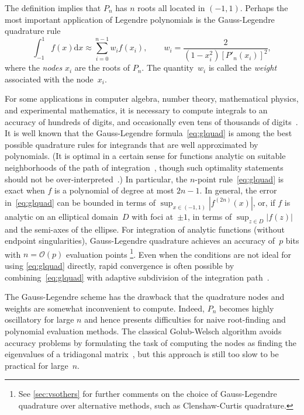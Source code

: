 \documentclass[nohypdvips,review]{siamart0216}
\newcommand{\dx}{\mathrm d x}
\newcommand{\OO}{\mathcal{O}}
\begin{document}
The definition implies that $P_n$ has $n$ roots all located in $(-1,1)$.
Perhaps the most important application of Legendre polynomials
is the Gauss-Legendre quadrature rule
\begin{equation}
\label{eq:glquad}
\int_{-1}^{1} f(x) \dx \approx \sum_{i=0}^{n-1} w_i f(x_i), \qquad
w_i = \frac{2}{(1-x_i^2) [P'_n(x_i)]^2},
\end{equation}
where the \emph{nodes} $x_i$ are the roots of $P_n$.
The quantity~$w_i$ is called the \emph{weight} associated
with the node~$x_i$.

For some applications in computer algebra, number theory,
mathematical physics, and experimental mathematics,
it is necessary to compute integrals to an accuracy of
hundreds of digits, and occasionally even tens of
thousands of
digits~\cite{bailey2011high,BaileyBorweinCrandall2006,Broadhurst2016,Molin2010a}.
It is well known that the Gauss-Legendre formula~\cref{eq:glquad} is
among the best possible quadrature rules for integrands that are
well approximated by polynomials.
(It is optimal in a certain sense for functions analytic on
suitable neighborhoods of the path of integration~\cite{kowalski1985gauss},
though such optimality statements should not be
over-interpreted~\cite{Trefethen2011}.)
In particular, the $n$-point rule~\cref{eq:glquad} is exact
when $f$ is a polynomial of degree at most $2n-1$.
In general, the error in~\cref{eq:glquad} can be bounded in terms of
$\sup_{x \in (-1,1)} |f^{(2n)}(x)|$, or, if $f$ is analytic on an
elliptical domain~$D$ with foci at~$\pm 1$, in terms of
$\sup_{z \in D} |f(z)|$ and the semi-axes of the ellipse.
For integration of analytic functions (without endpoint singularities),
Gauss-Legendre quadrature achieves an accuracy of~$p$ bits with $n = \OO(p)$
evaluation points%
\footnote{See \cref{sec:vsothers} for further comments on the choice of
Gauss-Legendre quadrature over alternative methods, such as
Clenshaw-Curtis quadrature.}.
Even when the conditions are not ideal for using \cref{eq:glquad} directly,
rapid convergence is often possible
by combining~\cref{eq:glquad}
with adaptive subdivision of the integration path~\cite{petras2002self}.

The Gauss-Legendre scheme has the drawback
that the quadrature nodes and weights are
somewhat inconvenient to compute.
Indeed, $P_n$ becomes highly oscillatory for
large $n$ and hence presents difficulties
for naive root-finding and polynomial evaluation methods.
The classical Golub-Welsch algorithm avoids accuracy problems
by formulating the task of computing the nodes as
finding the eigenvalues of a tridiagonal matrix~\cite{golub1969calculation},
but this approach is still too slow to be practical for large~$n$.
\end{document}
